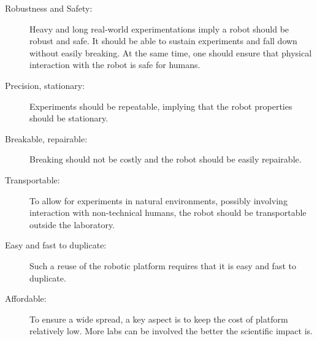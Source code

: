 \begin{description}
    \item[Robustness and Safety:] Heavy and long real-world experimentations imply a robot should be robust and safe. It should be able to sustain experiments and fall down without easily breaking. At the same time, one should ensure that physical interaction with the robot is safe for humans.
    \item [Precision, stationary:]Experiments should be repeatable, implying that the robot properties should be stationary.
    \item [Breakable, repairable:] Breaking should not be costly and the robot should be easily repairable.
    \item [Transportable:] To allow for experiments in natural environments, possibly involving interaction with non-technical humans, the robot should be transportable outside the laboratory.
    \item [Easy and fast to duplicate:]Such a reuse of the robotic platform requires that it is easy and fast to duplicate.
    \item [Affordable:] To ensure a wide spread, a key aspect is to keep the cost of platform relatively low. More labs can be involved the better the scientific impact is.
\end{description}











